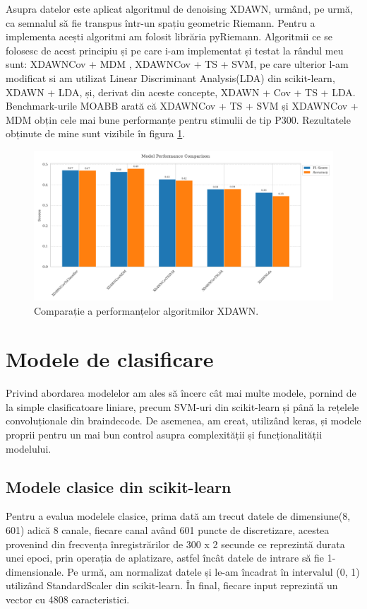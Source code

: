 Asupra datelor este aplicat algoritmul de denoising XDAWN\cite{xdawn}, urmând, pe urmă, ca semnalul să fie transpus într-un spațiu geometric Riemann. Pentru a implementa acești algoritmi am folosit librăria pyRiemann\cite{pyriemann}. Algoritmii ce se folosesc de acest principiu și pe care i-am implementat și testat la rândul meu sunt: XDAWNCov + MDM \cite{xdawncov_mdm}, XDAWNCov + TS + SVM\cite{xdawncovtssvm}, pe care ulterior l-am modificat si am utilizat Linear Discriminant Analysis(LDA) din scikit-learn\cite{scikit-learn}, XDAWN + LDA\cite{xdawnlda}, și, derivat din aceste concepte, XDAWN + Cov + TS + LDA. Benchmark-urile MOABB\cite{moabb}  arată că XDAWNCov + TS + SVM și XDAWNCov + MDM obțin cele mai bune performanțe pentru stimulii de tip P300. Rezultatele obținute de mine sunt vizibile în figura \ref{fig:rezultate_xdawn}.

\vspace{1em}
\begin{figure}[H]
    \centering
		\vspace{-1em}
    \includegraphics[width=1\linewidth]{comparison_xdawn.png}
    \caption{Comparație a performanțelor algoritmilor XDAWN.}
		\vspace{-1em}
    \label{fig:rezultate_xdawn}
\end{figure}

\section{Modele de clasificare}
Privind abordarea modelelor am ales să încerc cât mai multe modele, pornind de la simple clasificatoare liniare, precum SVM-uri din scikit-learn\cite{scikit-learn} și până la rețelele convoluționale din braindecode\cite{braindecode}. De asemenea, am creat, utilizând keras\cite{keras}, și modele proprii pentru un mai bun control asupra complexității și funcționalității modelului.
\subsection{Modele clasice din scikit-learn}
Pentru a evalua modelele clasice, prima dată am trecut datele de dimensiune(8, 601) adică 8 canale, fiecare canal având 601 puncte de discretizare, acestea provenind din frecvența înregistrărilor de 300 x 2 secunde ce reprezintă durata unei epoci, prin operația de aplatizare, astfel încât datele de intrare să fie 1-dimensionale. Pe urmă, am normalizat datele și le-am încadrat în intervalul (0, 1) utilizând StandardScaler din scikit-learn\cite{scikit-learn}. În final, fiecare input reprezintă un vector cu 4808 caracteristici.

